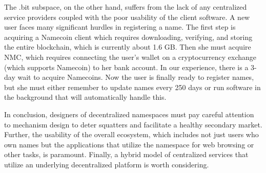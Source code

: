 The .bit subspace, on the other hand, suffers from the lack of any centralized service providers coupled with the poor usability of the client software. A new user faces many significant hurdles in registering a name. The first step is acquiring a Namecoin client which requires downloading, verifying, and storing the entire blockchain, which is currently about 1.6 GB. Then she must acquire NMC, which requires connecting the user's wallet on a cryptocurrency exchange (which supports Namecoin) to her bank account. In our experience, there is a 3-day wait to acquire Namecoins. Now the user is finally ready to register names, but she must either remember to update names every 250 days or run software in the background that will automatically handle this.

In conclusion, designers of decentralized namespaces must pay careful attention to mechanism design to deter squatters and facilitate a healthy secondary market. Further, the usability of the overall ecosystem, which includes not just users who own names but the applications that utilize the namespace for web browsing or other tasks, is paramount. Finally, a hybrid model of centralized services that utilize an underlying decentralized platform is worth considering.

